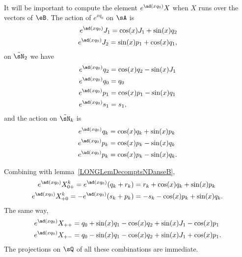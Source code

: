 It will be important to compute the element $ e^{\ad(xq_0)}X$ when $X$ runs over the vectors of $\eB$.
%
The action of $e^{xq_0}$ on $\sA$ is
\begin{subequations}			\label{LONGSubEqsAdxqzJJ}
	\begin{align}
		e^{\ad(xq_0)}J_1=\cos(x)J_1+\sin(x)q_2\\
		e^{\ad(xq_0)}J_2=\sin(x)p_1+\cos(x)q_1,
	\end{align}
\end{subequations}
on $\tilde\sN_2$ we have
\begin{subequations}					\label{LONGSubEqsexpxzqpsdzuu}
	\begin{align}
		e^{\ad(xq_0)}q_2&=\cos(x)q_2-\sin(x)J_1\\
		e^{\ad(xq_0)}q_0&=q_0\\
		e^{\ad(xq_0)}p_1&=\cos(x)p_1-\sin(x)q_1 		\label{LONGEqAdqzpUn}\\
		e^{\ad(xq_0)}s_1&=s_1,
	\end{align}
\end{subequations}
and the action on $\tilde\sN_k$ is
\begin{subequations}		\label{LONGEqExpAdqkpk}
	\begin{align}
		e^{\ad(xq_0)}q_k&=\cos(x)q_k+\sin(x)p_k\\
		e^{\ad(xq_0)}p_k&=\cos(x)p_k-\sin(x)q_k\\
		e^{\ad(xq_0)}p_k&=\cos(x)p_k-\sin(x)q_k.
	\end{align}
\end{subequations}

Combining with lemma~\ref{LONGLemDecomptsNDanseB},
\begin{subequations}			\label{LONGEqExpoQzSurNk}
	\begin{align}
		e^{\ad(xq_0)}X_{0+}^k=e^{\ad(xq_0)}(q_k+r_k)&=r_k+\cos(x)q_k+\sin(x)p_k		\label{LONGEqExpoQzSurNka}\\
		e^{\ad(xq_0)}X_{+0}^k=-e^{\ad(xq_0)}(s_k+p_k)&=-s_k-\cos(x)p_k+\sin(x)q_k.\label{LONGEqExpoQzSurNkb}
	\end{align}
\end{subequations}
The same way,
\begin{subequations}			\label{LONGEqExpoQzN}
	\begin{align}
		e^{\ad(xq_0)}X_{++}&=q_0+\sin(x)q_1-\cos(x)q_2+\sin(x)J_1-\cos(x)p_1\\
		e^{\ad(xq_0)}X_{+-}&=q_0-\sin(x)q_1-\cos(x)q_2+\sin(x)J_1+\cos(x)p_1.
	\end{align}
\end{subequations}
The projections on $\sQ$ of all these combinations are immediate.

